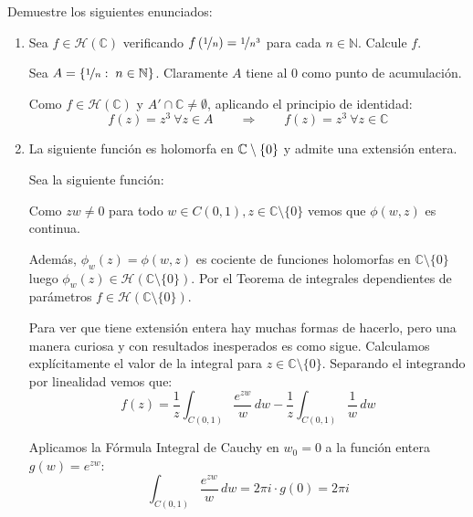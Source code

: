 \documentclass[12pt]{article}
\begin{document}
    \begin{ejercicio}
        Demuestre los siguientes enunciados:
        \begin{enumerate}
            \item Sea $f \in \mathcal{H}(\mathbb{C})$ verificando $f\left(\nicefrac{1}{n}\right) = \nicefrac{1}{n^3}$ para cada $n \in \mathbb{N}$. Calcule $f$.
            
                \bigskip

                Sea $A = \{\nicefrac{1}{n}:\;n \in \mathbb{N}\}$. Claramente $A$ tiene al $0$ como punto de acumulación.

                Como $f \in \mathcal{H}(\mathbb{C})$ y $A'\cap \mathbb{C} \neq \emptyset$, aplicando el principio de identidad:
                \[f(z) = z^3 \ \forall z\in A \qquad \Longrightarrow \qquad f(z) = z^3 \ \forall z \in \mathbb{C}\]

            \item La siguiente función es holomorfa en $\mathbb{C}\setminus \{0\}$ y admite una extensión entera.

                \bigskip
                Sea la siguiente función:

                Como $zw \neq 0$ para todo $w\in C(0,1), z \in \mathbb{C}\setminus\{0\}$ vemos que $\phi(w,z)$ es continua.
                
                Además, $\phi_w(z) = \phi(w,z)$ es cociente de funciones holomorfas en $\mathbb{C}\setminus\{0\}$ luego $\phi_w(z) \in \mathcal{H}(\mathbb{C}\setminus\{0\})$. Por el Teorema de integrales dependientes de parámetros $f \in \mathcal{H}(\mathbb{C}\setminus\{0\})$.

                \bigskip

                Para ver que tiene extensión entera hay muchas formas de hacerlo, pero una manera curiosa y con resultados inesperados es como sigue. Calculamos explícitamente el valor de la integral para $z \in \mathbb{C} \setminus \{0\}$. 
                Separando el integrando por linealidad vemos que:
                \[f(z) = \frac{1}{z} \int_{C(0,1)} \frac{e^{zw}}{w} \, dw - \frac{1}{z} \int_{C(0,1)} \frac{1}{w} \, dw\]

                Aplicamos la Fórmula Integral de Cauchy en $w_0 = 0$ a la función entera $g(w) = e^{zw}$:
                \[\int_{C(0,1)} \frac{e^{zw}}{w} \, dw = 2\pi i \cdot g(0) = 2\pi i\]


\end{enumerate}
\end{ejercicio}
\end{document}
